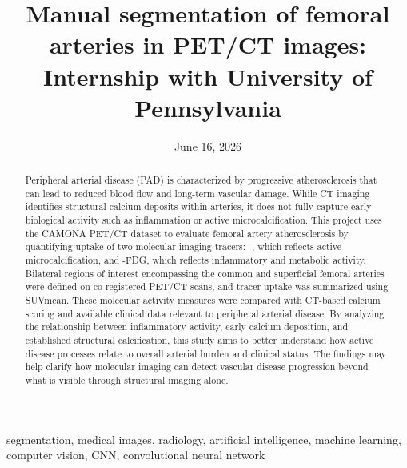 \documentclass[12pt,conference,onecolumn]{IEEEtran}
\title{Manual segmentation of femoral arteries in PET/CT images: Internship with University of Pennsylvania}
\author{%
\IEEEauthorblockN{Dia Avalur}\IEEEauthorblockA{Science \& Engineering\\Manalapan High School\\Englishtown, NJ\\\href{mailto:426davalur@frhsd.com}{426davalur@frhsd.com}}}
\date{June 16, 2026}
\newcommand{\keywords}{segmentation, medical images, radiology, artificial intelligence, machine learning, computer vision, CNN, convolutional neural network}
\begin{document}
\maketitle 

\begin{abstract}
Peripheral arterial disease (PAD) is characterized by progressive atherosclerosis that can lead to reduced blood flow and long-term vascular damage. While CT imaging identifies structural calcium deposits within arteries, it does not fully capture early biological activity such as inflammation or active microcalcification. This project uses the CAMONA PET/CT dataset to evaluate femoral artery atherosclerosis by quantifying uptake of two molecular imaging tracers: -, which reflects active microcalcification, and -FDG, which reflects inflammatory and metabolic activity. Bilateral regions of interest encompassing the common and superficial femoral arteries were defined on co-registered PET/CT scans, and tracer uptake was summarized using SUVmean. These molecular activity measures were compared with CT-based calcium scoring and available clinical data relevant to peripheral arterial disease. By analyzing the relationship between inflammatory activity, early calcium deposition, and established structural calcification, this study aims to better understand how active disease processes relate to overall arterial burden and clinical status. The findings may help clarify how molecular imaging can detect vascular disease progression beyond what is visible through structural imaging alone.
\end{abstract}

\begin{IEEEkeywords}
\keywords
\end{IEEEkeywords}
\end{document}
